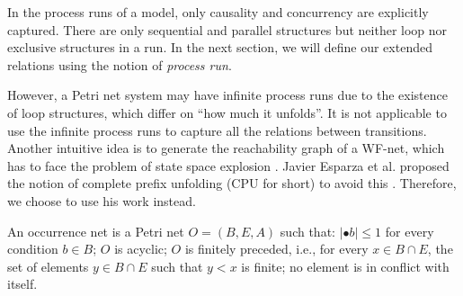 \documentclass{llncs}
\begin{document}
In the process runs of a model, only causality and concurrency are explicitly captured. There are only sequential and parallel structures but neither loop nor exclusive structures in a run. In the next section, we will define our extended relations using the notion of \textit{process run}.

However, a Petri net system may have infinite process runs due to the existence of loop structures, which differ on ``how much it unfolds''. It is not applicable to use the infinite process runs to capture all the relations between transitions. Another intuitive idea is to generate the reachability graph of a WF-net, which has to face the problem of state space explosion \cite{mcmillan1995technique}. Javier Esparza et al. proposed the notion of complete prefix unfolding (CPU for short) to avoid this \cite{esparza2002improvement}. Therefore, we choose to use his work instead.

\begin{definition}\label{def:occurrenceNet}
An occurrence net is a Petri net $O=(B,E,A)$ such that: $|\bullet b|\leq 1$ for every condition $b\in B$; $O$ is acyclic; $O$ is finitely preceded, i.e., for every $x\in B\cap E$, the set of elements $y\in B\cap E$ such that $y<x$ is finite; no element is in conflict with itself.
\end{definition}

\end{document}
